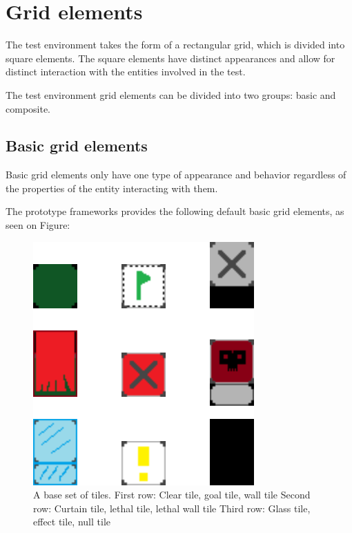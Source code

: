 \documentclass[masterthesis]{fer}
\begin{document}
\section{Grid elements}

The test environment takes the form of a rectangular grid, which is divided into square elements. The square elements have distinct appearances and allow for distinct interaction with the entities involved in the test.

The test environment grid elements can be divided into two groups: basic and composite.

\subsection{Basic grid elements}

Basic grid elements only have one type of appearance and behavior regardless of the properties of the entity interacting with them.

The prototype frameworks provides the following default basic grid elements, as seen on Figure:

\begin{figure}[htb]
  \centering
  \includegraphics[width=1\linewidth]{Figures/grid/all_tiles.png} 
  \caption{A base set of tiles.
  First row: Clear tile, goal tile, wall tile
  Second row: Curtain tile, lethal tile, lethal wall tile
  Third row: Glass tile, effect tile, null tile}
  \label{slk:tile_grid_tiles/floor.png}
\end{figure}
\end{document}
